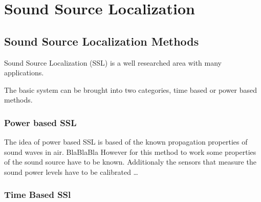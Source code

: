 \graphicspath{ {images/2_source_localization/} }
\chapter{Sound Source Localization}
\section{Sound Source Localization Methods}
Sound Source Localization (SSL)  is a well researched area with many applications.

The basic system can be brought into two categories, time based or power based methods.
\subsection{Power based SSL}
The idea of power based SSL is based of the known propagation properties of sound waves in air.
BlaBlaBla 
However for this method to work some properties of the sound source have to be known.
Additionaly the sensors that measure the sound power levels have to be calibrated \dots 

\subsection{Time Based SSl}



